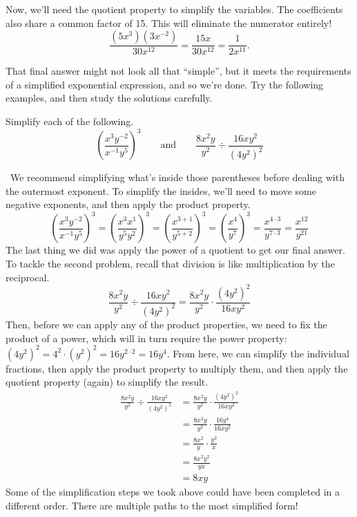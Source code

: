 Now, we'll need the quotient property to simplify the variables. The coefficients also share a common factor of 15. This will eliminate the numerator entirely!
\[\frac{(5x^3)(3x^{-2})}{30x^{12}} = \frac{15x}{30x^{12}} = \frac{1}{2x^{11}}.\]

That final answer might not look all that ``simple'', but it meets the requirements of a simplified exponential expression, and so we're done. Try the following examples, and then study the solutions carefully.

\begin{boxex}
Simplify each of the following.
\[\left(\frac{x^3y^{-2}}{x^{-1}y^5}\right)^3 \qquad\text{and}\qquad \frac{8x^2y}{y^2}\div\frac{16xy^2}{(4y^2)^2}\]

\exsoln\ We recommend simplifying what's inside those parentheses before dealing with the outermost exponent. To simplify the insides, we'll need to move some negative exponents, and then apply the product property.
\[\left(\frac{x^3y^{-2}}{x^{-1}y^5}\right)^3
= \left(\frac{x^3x^{1}}{y^5y^2}\right)^3
= \left(\frac{x^{3+1}}{y^{5+2}}\right)^3
= \left(\frac{x^4}{y^7}\right)^3
= \frac{x^{4\cdot3}}{y^{7\cdot3}}
= \frac{x^{12}}{y^{21}}
\]
The last thing we did was apply the power of a quotient to get our final answer. To tackle the second problem, recall that division is like multiplication by the reciprocal. 
\[\frac{8x^2y}{y^2}\div\frac{16xy^2}{(4y^2)^2} = \frac{8x^2y}{y^2}\cdot\frac{(4y^2)^2}{16xy^2}\]
Then, before we can apply any of the product properties, we need to fix the product of a power, which will in turn require the power property: $(4y^2)^2 = 4^2 \cdot (y^2)^2 = 16 y^{2\cdot2} = 16y^4$. From here, we can simplify the individual fractions, then apply the product property to multiply them, and then apply the quotient property (again) to simplify the result.
\[\begin{aligned}
\frac{8x^2y}{y^2}\div\frac{16xy^2}{(4y^2)^2}
&= \frac{8x^2y}{y^2}\cdot\frac{(4y^2)^2}{16xy^2}
\\[1ex]&= \frac{8x^2y}{y^2}\cdot\frac{16y^4}{16xy^2}
\\[1ex]&= \frac{8x^2}{y}\cdot\frac{y^2}{x}
\\[1ex]&= \frac{8x^2y^2}{yx}
\\[1ex]&= 8xy
\end{aligned}\]
Some of the simplification steps we took above could have been completed in a different order. There are multiple paths to the most simplified form!
\end{boxex}


